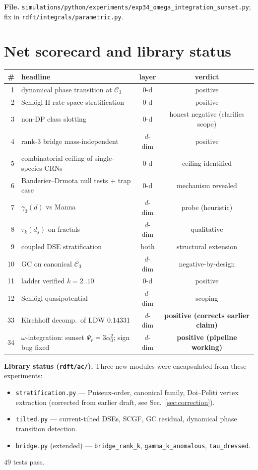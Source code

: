 \documentclass[11pt,a4paper]{article}
\theoremstyle{plain}
\newcommand{\Ck}{\mathcal{C}}
\begin{document}
\textbf{File.}  \texttt{simulations/python/experiments/exp34\_omega\_integration\_sunset.py};
fix in \texttt{rdft/integrals/parametric.py}.

\section{Net scorecard and library status}
\label{sec:scorecard}

\begin{center}
\begin{tabular}{rlcc}
\toprule
\# & headline & layer & verdict \\
\midrule
1  & dynamical phase transition at $\Ck_{3}$ & 0-d & positive \\
2  & Schl\"ogl II rate-space stratification & 0-d & positive \\
3  & non-DP class slotting & 0-d & honest negative (clarifies scope) \\
4  & rank-3 bridge mass-independent & $d$-dim & positive \\
5  & combinatorial ceiling of single-species CRNs & 0-d & ceiling identified \\
6  & Banderier--Drmota null tests + trap case & 0-d & mechanism revealed \\
7  & $\gamma_{3}(d)$ vs Manna & $d$-dim & probe (heuristic) \\
8  & $\tau_{k}(d_{s})$ on fractals & $d$-dim & qualitative \\
9  & coupled DSE stratification & both & structural extension \\
10 & GC on canonical $\Ck_{3}$ & $d$-dim & negative-by-design \\
11 & ladder verified $k=2$..$10$ & 0-d & positive \\
12 & Schl\"ogl quasipotential & $d$-dim & scoping \\
33 & Kirchhoff decomp.\ of LDW 0.14331 & $d$-dim & \textbf{positive (corrects earlier claim)} \\
34 & $\omega$-integration: sunset $\Psi_r=3\alpha_0^2$; sign bug fixed & $d$-dim & \textbf{positive (pipeline working)} \\
\bottomrule
\end{tabular}
\end{center}

\textbf{Library status (\texttt{rdft/ac/}).}  Three new modules were
encapsulated from these experiments:
\begin{itemize}[leftmargin=1.2em]
\item \texttt{stratification.py} --- Puiseux-order, canonical family,
  Doi--Peliti vertex extraction (corrected from earlier draft, see
  Sec.~\ref{sec:correction}).
\item \texttt{tilted.py} --- current-tilted DSEs, SCGF, GC residual,
  dynamical phase transition detection.
\item \texttt{bridge.py} (extended) --- \texttt{bridge\_rank\_k},
  \texttt{gamma\_k\_anomalous}, \texttt{tau\_dressed}.
\end{itemize}
$49$ tests pass.
\end{document}
